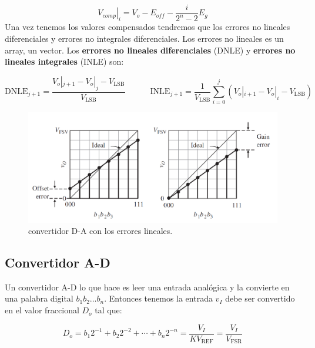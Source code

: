 \documentclass[12pt,a4paper]{article}
\numberwithin{equation}{section}
\numberwithin{figure}{section}
\newcommand{\parentesis}[1]{\left( #1  \right)}
\newcommand{\tquad}{\quad \quad \quad}
\newcommand{\REF}{\mathrm{REF}}
\newcommand{\FSR}{\mathrm{FSR}}
\newcommand{\LSB}{\mathrm{LSB}}
\newcommand{\DNLE}{\mathrm{DNLE}}
\newcommand{\INLE}{\mathrm{INLE}}
\begin{document}
\begin{equation}
\left. V_{comp}  \right|_i = V_o - E_{off} - \dfrac{i}{2^n - 2} E_g
\end{equation}
Una vez tenemos los valores compensados tendremos que los errores no lineales diferenciales y errores no integrales diferenciales.  Los errores no lineales es un array, un vector. Los \textbf{errores no lineales diferenciales} (DNLE) y \textbf{errores no lineales integrales} (INLE) son:

\begin{equation}
\DNLE_{j+1} = \dfrac{V_o|_{j+1} - V_o|_{j} - V_\LSB}{V_\LSB} \tquad 
\INLE_{j+1} = \dfrac{1}{V_\LSB} \sum_{i=0}^j \parentesis{ V_o|_{i+1} - V_o|_{i} - V_\LSB}
\end{equation}

\begin{figure}[h!] \centering
\includegraphics[scale=0.70]{3.1-Errores.png}
\caption{convertidor D-A con los errores lineales.}
\label{Fig:3.02}
\end{figure} 

\subsection{Convertidor A-D}

Un convertidor A-D lo que hace es leer una entrada analógica y la convierte en una palabra digital $b_1 b_2 \ldots b_n$. Entonces tenemos la entrada $v_I$ debe ser convertido en el valor fraccional $D_o$ tal que:

\begin{equation}
D_o = b_1 2^{-1} + b_2 2^{-2} + \cdots + b_n 2^{-n} = \dfrac{V_I}{K  V_\REF} = \dfrac{V_I}{V_\FSR} 
\end{equation}


 
 
\end{document}
